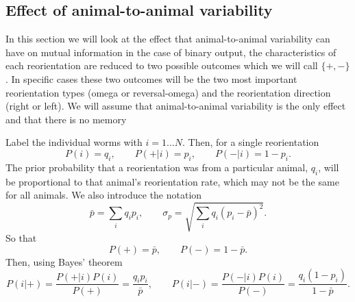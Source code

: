 \documentclass[12pt]{article}
\begin{document}
\subsection{Effect of animal-to-animal variability}\label{sec:variability}

In this section we will look at the effect that animal-to-animal variability can have on mutual information in the case of binary output, \ie the characteristics of each reorientation are reduced to two possible outcomes which we will call $\{+,-\}$. In specific cases these two outcomes will be the two most important reorientation types (omega or reversal-omega) and the reorientation direction (right or left). We will assume that animal-to-animal variability is the only effect and that there is no memory

Label the individual worms with $i=1\ldots N$. Then, for a single reorientation
%
\begin{equation}\label{eq:varisinglereo}
  P(i) = q_i, \qquad
  P(+|i) = p_i, \qquad
  P(-|i) = 1-p_i.
\end{equation}
%
The prior probability that a reorientation was from a particular animal, $q_i$, will be proportional to that animal's reorientation rate, which may not be the same for all animals. We also introduce the notation
%
\begin{equation}\label{eq:varinot}
  \bar{p} = \sum_i q_i p_i, \qquad
  \sigma_p = \sqrt{\sum_i q_i(p_i-\bar{p})^2}.
\end{equation}
%
So that
%
\begin{equation}\label{eq:varimarg}
  P(+) = \bar{p}, \qquad P(-) = 1-\bar{p}.
\end{equation}
%
Then, using Bayes' theorem
%
\begin{equation}\label{eq:singlereobayes}
  P(i|+) = \frac{P(+|i)P(i)}{P(+)} = \frac{q_ip_i}{\bar{p}}, \qquad
  P(i|-) = \frac{P(-|i)P(i)}{P(-)} = \frac{q_i(1-p_i)}{1-\bar{p}}.
\end{equation}
%
\end{document}
